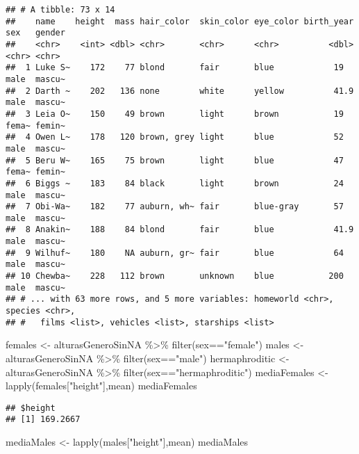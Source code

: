 \documentclass[
]{book}
\newenvironment{Shaded}{\begin{snugshade}}{\end{snugshade}}
\newcommand{\FunctionTok}[1]{\textcolor[rgb]{0.00,0.00,0.00}{#1}}
\newcommand{\NormalTok}[1]{#1}
\newcommand{\OtherTok}[1]{\textcolor[rgb]{0.56,0.35,0.01}{#1}}
\newcommand{\SpecialCharTok}[1]{\textcolor[rgb]{0.00,0.00,0.00}{#1}}
\newcommand{\StringTok}[1]{\textcolor[rgb]{0.31,0.60,0.02}{#1}}
\begin{document}
\begin{verbatim}
## # A tibble: 73 x 14
##    name    height  mass hair_color  skin_color eye_color birth_year sex   gender
##    <chr>    <int> <dbl> <chr>       <chr>      <chr>          <dbl> <chr> <chr> 
##  1 Luke S~    172    77 blond       fair       blue            19   male  mascu~
##  2 Darth ~    202   136 none        white      yellow          41.9 male  mascu~
##  3 Leia O~    150    49 brown       light      brown           19   fema~ femin~
##  4 Owen L~    178   120 brown, grey light      blue            52   male  mascu~
##  5 Beru W~    165    75 brown       light      blue            47   fema~ femin~
##  6 Biggs ~    183    84 black       light      brown           24   male  mascu~
##  7 Obi-Wa~    182    77 auburn, wh~ fair       blue-gray       57   male  mascu~
##  8 Anakin~    188    84 blond       fair       blue            41.9 male  mascu~
##  9 Wilhuf~    180    NA auburn, gr~ fair       blue            64   male  mascu~
## 10 Chewba~    228   112 brown       unknown    blue           200   male  mascu~
## # ... with 63 more rows, and 5 more variables: homeworld <chr>, species <chr>,
## #   films <list>, vehicles <list>, starships <list>
\end{verbatim}

\begin{Shaded}
\begin{Highlighting}[]
\NormalTok{females }\OtherTok{\textless{}{-}}\NormalTok{ alturasGeneroSinNA }\SpecialCharTok{\%\textgreater{}\%} \FunctionTok{filter}\NormalTok{(sex}\SpecialCharTok{==}\StringTok{"female"}\NormalTok{)}
\NormalTok{males }\OtherTok{\textless{}{-}}\NormalTok{ alturasGeneroSinNA }\SpecialCharTok{\%\textgreater{}\%} \FunctionTok{filter}\NormalTok{(sex}\SpecialCharTok{==}\StringTok{"male"}\NormalTok{)}
\NormalTok{hermaphroditic }\OtherTok{\textless{}{-}}\NormalTok{ alturasGeneroSinNA }\SpecialCharTok{\%\textgreater{}\%} \FunctionTok{filter}\NormalTok{(sex}\SpecialCharTok{==}\StringTok{"hermaphroditic"}\NormalTok{)}
\NormalTok{mediaFemales }\OtherTok{\textless{}{-}} \FunctionTok{lapply}\NormalTok{(females[}\StringTok{"height"}\NormalTok{],mean)}
\NormalTok{mediaFemales}
\end{Highlighting}
\end{Shaded}

\begin{verbatim}
## $height
## [1] 169.2667
\end{verbatim}

\begin{Shaded}
\begin{Highlighting}[]
\NormalTok{mediaMales }\OtherTok{\textless{}{-}} \FunctionTok{lapply}\NormalTok{(males[}\StringTok{"height"}\NormalTok{],mean)}
\NormalTok{mediaMales}
\end{Highlighting}
\end{Shaded}
\end{document}

